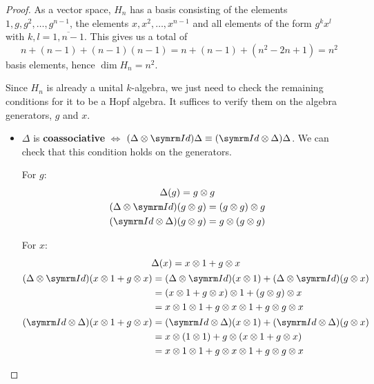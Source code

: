 \begin{proof}
As a vector space, \(H_n\) has a basis consisting of the elements \(1, g, g^2, \dots, g^{n-1}\), the elements \(x, x^2, \dots, x^{n-1}\) and all elements of the form \(g^{k} x^{l}\) with \(k, l = \overline{1, n - 1}\). This gives us a total of 
\[
    n + (n - 1) + (n - 1)(n - 1) = n + (n - 1) + (n^2 - 2n + 1) = n^2
\]
basis elements, hence \(\dim H_n = n^2\).

Since \(H_n\) is already a unital \(k\)-algebra, we just need to check the remaining conditions for it to be a Hopf algebra. It suffices to verify them on the algebra generators, \(g\) and \(x\).
\begin{itemize}
    \item \(\Delta\) is \textbf{coassociative} \(\iff\) \((\Delta \tensor \Id) \Delta \equiv (\Id \tensor \Delta) \Delta\). We can check that this condition holds on the generators.

    For \(g\):
    \begin{gather*}
        \Delta(g) = g \tensor g \\
        (\Delta \tensor \Id) (g \tensor g) = (g \tensor g) \tensor g \\
        (\Id \tensor \Delta) (g \tensor g) = g \tensor (g \tensor g)
    \end{gather*}

    For \(x\):
    \begin{gather*}
        \Delta(x) = x \tensor 1 + g \tensor x \\
        \begin{aligned}
            (\Delta \tensor \Id) (x \tensor 1 + g \tensor x) &= (\Delta \tensor \Id) (x \tensor 1) + (\Delta \tensor \Id) (g \tensor x) \\
            &= (x \tensor 1 + g \tensor x) \tensor 1 + (g \tensor g) \tensor x \\
            &= x \tensor 1 \tensor 1 + g \tensor x \tensor 1 + g \tensor g \tensor x
        \end{aligned} \\
        \begin{aligned}
            (\Id \tensor \Delta) (x \tensor 1 + g \tensor x) &= (\Id \tensor \Delta) (x \tensor 1) + (\Id \tensor \Delta) (g \tensor x) \\
            &= x \tensor (1 \tensor 1) + g \tensor (x \tensor 1 + g \tensor x) \\
            &= x \tensor 1 \tensor 1 + g \tensor x \tensor 1 + g \tensor g \tensor x
        \end{aligned}
    \end{gather*}


\end{itemize}
\end{proof}

